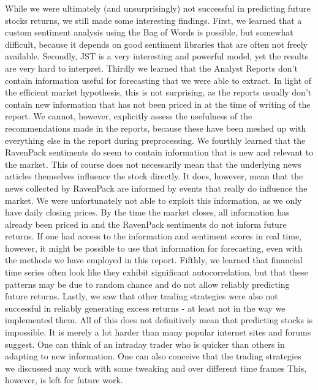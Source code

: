 While we were ultimately (and unsurprisingly) not successful in predicting future stocks returns, we still made some interesting findings. First, we learned that a custom sentiment analysis using the Bag of Words is possible, but somewhat difficult, because it depends on good sentiment libraries that are often not freely available. Secondly, JST is a very interesting and powerful model, yet the results are very hard to interpret. Thirdly we learned that the Analyst Reports don't contain information useful for forecasting that we were able to extract. In light of the efficient market hypothesis, this is not surprising, as the reports usually don't contain new information that has not been priced in at the time of writing of the report. We cannot, however, explicitly assess the usefulness of the  recommendations made in the reports, because these have been meshed up with everything else in the report during preprocessing. We fourthly learned that the RavenPack sentiments do seem to contain information that is new and relevant to the market. This of course does not necessarily mean that the underlying news articles themselves influence the stock directly. It does, however, mean that the news collected by RavenPack are informed by events that really do influence the market. We were unfortunately not able to exploit this information, as we only have daily closing prices. By the time the market closes, all information has already been priced in and the RavenPack sentiments do not inform future returns. If one had access to the information and sentiment scores in real time, however, it might be possible to use that information for forecasting, even with the methods we have employed in this report. Fifthly, we learned that financial time series often look like they exhibit significant autocorrelation, but that these patterns may be due to random chance and do not allow reliably predicting future returns. Lastly, we saw that other trading strategies were also not successful in reliably generating excess returns - at least not in the way we implemented them. All of this does not definitively mean that predicting stocks is impossible. It is merely a lot harder than many popular internet sites and forums suggest. One can think of an intraday trader who is quicker than others in adapting to new information. One can also conceive that the trading strategies we discussed may work with some tweaking and over different time frames This, however, is left for future work. 







